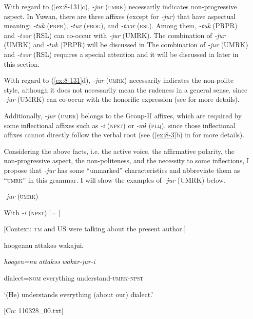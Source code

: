   With regard to (\ref{ex:8-131}c), \textit{{}-jur} (\textsc{umrk}) necessarily indicates non-progressive aspect. In Yuwan, there are three affixes (except for \textit{{}-jur}) that have aspectual meaning: \textit{{}-tuk} (\textsc{prpr}), \textit{{}-tur} (\textsc{prog}), and \textit{{}-təər} (\textsc{rsl}). Among them, \textit{{}-tuk} (PRPR) and \textit{{}-təər} (RSL) can co-occur with \textit{{}-jur} (UMRK). The combination of \textit{{}-jur} (UMRK) and \textit{{}-tuk} (PRPR) will be discussed in  The combination of \textit{{}-jur} (UMRK) and \textit{{}-təər} (RSL) requires a special attention and it will be discussed in later in this section.

With regard to (\ref{ex:8-131}d), \textit{{}-jur} (\textsc{umrk}) necessarily indicates the non-polite style, although it does not necessarily mean the rudeness in a general sense, since \textit{{}-jur} (UMRK) can co-occur with the honorific expression (see  for more details).

Additionally, \textit{{}-jur} (\textsc{umrk}) belongs to the Group-II affixes, which are required by some inflectional affixes such as \textit{{}-i} (\textsc{npst}) or \textit{{}-mɨ} (\textsc{plq}), since those inflectional affixes cannot directly follow the verbal root (see (\ref{ex:8-3}b) in  for more details).

  Considering the above facts, i.e. the active voice, the affirmative polarity, the non-progressive aspect, the non-politeness, and the necessity to some inflections, I propose that \textit{{}-jur} has some “unmarked” characteristics and abbreviate them as “\textsc{umrk}” in this grammar. I will show the examples of \textit{{}-jur} (UMRK) below.

\ea\label{ex:8-132}
  \textit{{}-jur} (\textsc{umrk})

\ea With \textit{{}-i} (\textsc{npst}) [= ]

  [Context: \textsc{tm} and US were talking about the present author.]

  {\TM}
\glll  {\textbar}hoogen{\textbar}nu  attakəə  wakajui.

    \textit{hoogen=nu}  \textit{attakəə}  \textit{wakar-jur-i}

    dialect=\textsc{nom}  everything  understand-\textsc{umrk}-\textsc{npst}

    ‘(He) understands everything (about our) dialect.’

    [Co: 110328\_00.txt]
\z

